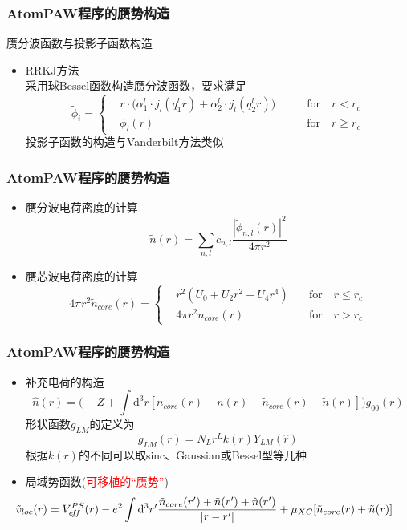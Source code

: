 \documentclass[cjk,slidestop,compress,mathserif,blue]{beamer}
\begin{document}
\frame
{
	\frametitle{\textrm{AtomPAW}程序的赝势构造}
	赝分波函数与投影子函数构造
	\begin{itemize}
		\item \textrm{RRKJ}方法\\
			采用球\textrm{Bessel}函数构造赝分波函数，要求满足
	\begin{displaymath}
		\tilde\phi_i=\left\{
			\begin{aligned}
				&r\cdot\bigg(\alpha_1^l\cdot j_l(q_1^lr)+\alpha_2^l\cdot j_l(q_2^lr)\bigg) \qquad &\mathrm{for}\quad r<r_c \\
				&\phi_l(r)\qquad &\mathrm{for}\quad r\geqslant r_c
			\end{aligned}
			\right.
	\end{displaymath}
	投影子函数的构造与\textrm{Vanderbilt}方法类似
	\end{itemize}
}


\frame
{
	\frametitle{\textrm{AtomPAW}程序的赝势构造}
	\begin{itemize}
		\item 赝分波电荷密度的计算
	$$\tilde n(r)=\sum_{n,l}c_{n,l}\dfrac{|\tilde\phi_{n,l}(r)|^2}{4\pi r^2}$$
		\item 赝芯波电荷密度的计算
	\begin{displaymath}
		4\pi r^2\tilde n_{core}(r)=\left\{
			\begin{aligned}
				&r^2(U_0+U_2r^2+U_4r^4)\quad &\mathrm{for}\quad r\leqslant r_c \\
				&4\pi r^2n_{core}(r)\quad &\mathrm{for}\quad r>r_c
			\end{aligned}
			\right.
	\end{displaymath}
	\end{itemize}
}

\frame
{
	\frametitle{\textrm{AtomPAW}程序的赝势构造}
	\begin{itemize}
		\item 补充电荷的构造
			$$\hat n(r)=\bigg(-Z+\int\mathrm{d}^3r[n_{core}(r)+n(r)-\tilde n_{core}(r)-\tilde n(r)]\bigg)g_{00}(r)$$
			形状函数$g_{LM}$的定义为$$g_{LM}(r)=N_Lr^Lk(r)Y_{LM}(\hat r)$$
			根据$k(r)$的不同可以取\textrm{sinc}、\textrm{Gaussian}或\textrm{Bessel}型等几种
		\item 局域势函数(\textcolor{red}{可移植的“赝势”})
			{\fontsize{9.5pt}{5.2pt}\selectfont$$\hspace*{-25pt}\tilde v_{loc}(r)=V_{e\!f\!f}^{PS}(r)-e^2\int\mathrm{d}^3r^{\prime}\dfrac{\tilde n_{core}(r^{\prime})+\tilde n(r^{\prime})+\hat n(r^{\prime})}{|r-r^{\prime}|}+\mu_{XC}[\tilde n_{core}(r)+\tilde n(r)]$$}
	\end{itemize}
}
\end{document}
